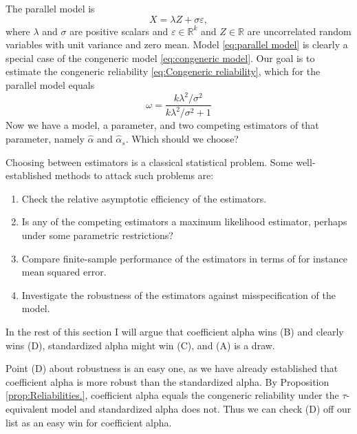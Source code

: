 \documentclass[twoside]{article}
\DeclareMathOperator{\Cor}{Cor}
\renewcommand{\sqrt}[1]{{(#1)^{1/2}}}
\begin{document}
The parallel model is
\begin{equation}
\label{eq:parallel model}
X = \lambda Z + \sigma\varepsilon,
\end{equation}
where $\lambda$ and $\sigma$ are positive scalars and $\varepsilon\in\mathbb{R}^k$ and $Z\in\mathbb{R}$ are uncorrelated random variables with unit variance and zero mean. Model \eqref{eq:parallel model} is clearly a special case of the congeneric model \eqref{eq:congeneric model}. Our goal is to estimate the congeneric reliability \eqref{eq:Congeneric reliability}, which for the parallel model equals
\begin{equation}
\label{eq:parallel_omega}
\omega = \frac{k\lambda^2/\sigma^2}{k\lambda^2/\sigma^2 + 1}
\end{equation}
Now we have a model, a parameter, and two competing estimators of that parameter, namely $\hat{\alpha}$ and $\hat{\alpha}_s$. Which should we choose? 

Choosing between estimators is a classical statistical problem. Some well-established methods to attack such problems are:


\begin{enumerate}[label=(\Alph*)]
\item Check the relative asymptotic efficiency of the estimators.
\item Is any of the competing estimators a maximum likelihood estimator, perhaps under some parametric restrictions?
\item Compare finite-sample performance of the estimators in terms of for instance mean squared error.
\item Investigate the robustness of the estimators against misspecification of the model.
\end{enumerate}

In the rest of this section I will argue that coefficient alpha wins (B) and clearly wins (D), standardized alpha might win (C), and (A) is a draw.  

Point (D) about robustness is an easy one, as we have already established that coefficient alpha is more robust than the standardized alpha. By Proposition \ref{prop:Reliabilities.}, coefficient alpha equals the congeneric reliability under the $\tau$-equivalent model and standardized alpha does not. Thus we can check (D) off our list as an easy win for coefficient alpha.
\end{document}
